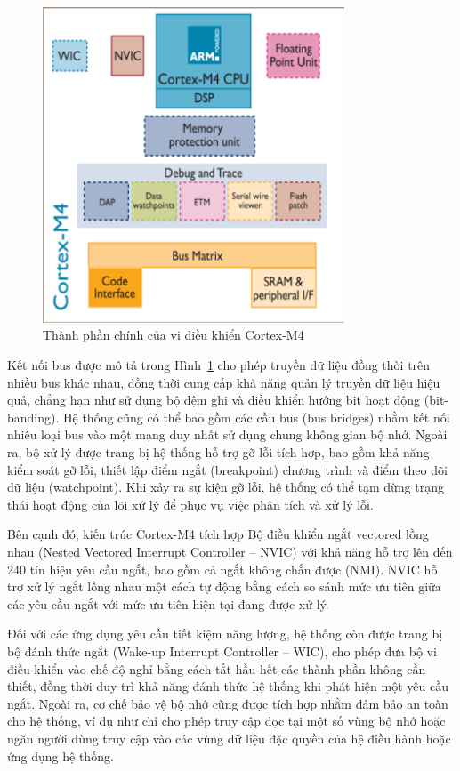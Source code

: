 \begin{figure}[htbp]
		\centering
 		\includegraphics[width=0.8\textwidth]{images/cortexM4.png}
		\caption{Thành phần chính của vi điều khiển Cortex-M4}
		\label{cortexM4}
\end{figure}

Kết nối bus được mô tả trong Hình~\ref{cortexM4} cho phép truyền dữ liệu đồng thời trên nhiều bus khác nhau, đồng thời cung cấp khả năng quản lý truyền dữ liệu hiệu quả, chẳng hạn như sử dụng bộ đệm ghi và điều khiển hướng bit hoạt động (bit-banding). Hệ thống cũng có thể bao gồm các cầu bus (bus bridges) nhằm kết nối nhiều loại bus vào một mạng duy nhất sử dụng chung không gian bộ nhớ. Ngoài ra, bộ xử lý được trang bị hệ thống hỗ trợ gỡ lỗi tích hợp, bao gồm khả năng kiểm soát gỡ lỗi, thiết lập điểm ngắt (breakpoint) chương trình và điểm theo dõi dữ liệu (watchpoint). Khi xảy ra sự kiện gỡ lỗi, hệ thống có thể tạm dừng trạng thái hoạt động của lõi xử lý để phục vụ việc phân tích và xử lý lỗi.

Bên cạnh đó, kiến trúc Cortex-M4 tích hợp Bộ điều khiển ngắt vectored lồng nhau (Nested Vectored Interrupt Controller – NVIC) với khả năng hỗ trợ lên đến 240 tín hiệu yêu cầu ngắt, bao gồm cả ngắt không chắn được (NMI). NVIC hỗ trợ xử lý ngắt lồng nhau một cách tự động bằng cách so sánh mức ưu tiên giữa các yêu cầu ngắt với mức ưu tiên hiện tại đang được xử lý.

Đối với các ứng dụng yêu cầu tiết kiệm năng lượng, hệ thống còn được trang bị bộ đánh thức ngắt (Wake-up Interrupt Controller – WIC), cho phép đưa bộ vi điều khiển vào chế độ nghỉ bằng cách tắt hầu hết các thành phần không cần thiết, đồng thời duy trì khả năng đánh thức hệ thống khi phát hiện một yêu cầu ngắt. Ngoài ra, cơ chế bảo vệ bộ nhớ cũng được tích hợp nhằm đảm bảo an toàn cho hệ thống, ví dụ như chỉ cho phép truy cập đọc tại một số vùng bộ nhớ hoặc ngăn người dùng truy cập vào các vùng dữ liệu đặc quyền của hệ điều hành hoặc ứng dụng hệ thống.


